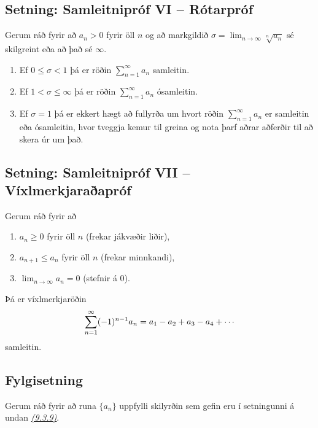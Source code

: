 \documentclass[b5paper,10pt,icelandic]{sphinxmanual}
\begin{document}
\subsection{Setning: Samleitnipróf VI – Rótarpróf}
\label{kafli09:setning-samleitniprof-vi-rotarprof}
Gerum ráð fyrir að \(a_n>0\) fyrir öll \(n\) og að markgildið
\(\sigma=\lim_{n\rightarrow\infty}\sqrt[n]{a_n}\) sé skilgreint eða
að það sé \(\infty\).
\begin{enumerate}
\item {} 
Ef \(0\leq\sigma<1\) þá er röðin \(\sum_{n=1}^\infty a_n\)
samleitin.

\item {} 
Ef \(1<\sigma\leq \infty\) þá er röðin
\(\sum_{n=1}^\infty a_n\) ósamleitin.

\item {} 
Ef \(\sigma=1\) þá er ekkert hægt að fullyrða um hvort röðin
\(\sum_{n=1}^\infty a_n\) er samleitin eða ósamleitin, hvor
tveggja kemur til greina og nota þarf aðrar aðferðir til að skera
úr um það.

\end{enumerate}


\subsection{Setning: Samleitnipróf VII – Víxlmerkjaraðapróf}
\label{kafli09:setning-samleitniprof-vii-vixlmerkjaraaprof}\label{kafli09:vixlmerkjaprof}
Gerum ráð fyrir að
\begin{enumerate}
\item {} 
\(a_n\geq 0\) fyrir öll \(n\) (frekar jákvæðir liðir),

\item {} 
\(a_{n+1}\leq a_n\) fyrir öll \(n\) (frekar minnkandi),

\item {} 
\(\lim_{n\rightarrow\infty} a_n=0\) (stefnir á 0).

\end{enumerate}

Þá er víxlmerkjaröðin
\begin{gather}
\begin{split}\sum_{n=1}^\infty (-1)^{n-1}a_n=a_1-a_2+a_3-a_4+\cdots\end{split}\notag
\end{gather}
samleitin.


\subsection{Fylgisetning}
\label{kafli09:id11}
Gerum ráð fyrir að runa \(\{a_n\}\) uppfylli skilyrðin sem gefin eru
í setningunni á undan {\hyperref[kafli09:vixlmerkjaprof]{\emph{(9.3.9)}}}.
\end{document}
